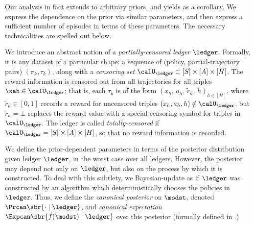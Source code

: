 %

Our analysis in fact extends to arbitrary priors, and yields  as a corollary. We express the dependence on the prior via similar parameters, and then express a sufficient number of episodes in terms of these parameters. The necessary technicalities are spelled out below.

We introduce an abstract notion of a \emph{partially-censored ledger} $\ledger$. Formally,
it is any dataset of a particular shape: a sequence of (policy, partial-trajectory pairs) $(\pi_k,\tau_k)$,  along with a \emph{censoring set} $\calU_{\ledger} \subset [S]\times[A]\times[H]$. The reward information is censored out from all trajectories for all triples $\xah\in \calU_{\ledger}$; that is, each $\tau_k$ is of the form $(x_h,\,a_h,\, \tilde{r}_h,\,h)_{h\in[H]}$, where $\tilde{r}_h \in [0,1]$ records a reward for uncensored triples $(x_h,a_h,h) \notin \calU_{\ledger}$, but $\tilde{r}_h = \bot$ replaces the reward value with a special censoring symbol for triples in $\calU_{\ledger}$.
 The ledger is called \emph{totally-censored} if
    $\calU_\ledger = [S]\times[A]\times[H]$, so that no reward information is recorded.

We define the prior-dependent parameters in terms of the posterior distribution given ledger $\ledger$, in the worst case over all ledgers. However, the posterior may depend not only on $\ledger$, but also on the process by which it is constructed. To deal with this subtlety, we Bayesian-update as if $\ledger$ was constructed by an algorithm which deterministically chooses the policies in $\ledger$. Thus, we define the \emph{canonical posterior} on $\modst$, denoted  $\Prcan\sbr{ \cdot \mid \ledger }$, and  \emph{canonical expectation} $\Expcan\sbr{f(\modst)\mid \ledger}$ over this posterior (formally defined in .)


